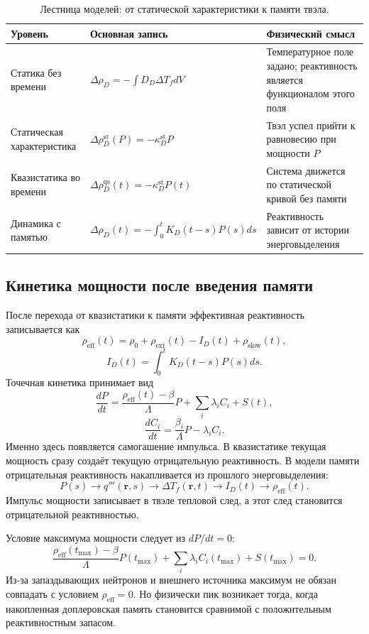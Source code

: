 \documentclass[12pt]{article}
\begin{document}
\begin{table}[H]
\centering
\caption{Лестница моделей: от статической характеристики к памяти твэла.}
\label{tab:static_to_memory_ladder}
\begin{tabular}{|>{\centering\arraybackslash}p{3.0cm}|p{5.2cm}|p{5.4cm}|}
\hline
Уровень & Основная запись & Физический смысл\\
\hline
Статика без времени & \(\Delta\rho_D=-\int D_D\Delta T_f dV\) & Температурное поле задано; реактивность является функционалом этого поля\\
\hline
Статическая характеристика & \(\Delta\rho_D^{\mathrm{st}}(P)=-\kappa_D^{\mathrm{st}}P\) & Твэл успел прийти к равновесию при мощности \(P\)\\
\hline
Квазистатика во времени & \(\Delta\rho_D^{\mathrm{qs}}(t)=-\kappa_D^{\mathrm{st}}P(t)\) & Система движется по статической кривой без памяти\\
\hline
Динамика с памятью & \(\Delta\rho_D(t)=-\int_0^tK_D(t-s)P(s)ds\) & Реактивность зависит от истории энерговыделения\\
\hline
\end{tabular}
\end{table}

\subsection{Кинетика мощности после введения памяти}

После перехода от квазистатики к памяти эффективная реактивность записывается как
\[
\rho_{\mathrm{eff}}(t)
=
\rho_0+
\rho_{\mathrm{ext}}(t)-I_D(t)+\rho_{\mathrm{slow}}(t),
\]
\[
I_D(t)=\int_0^tK_D(t-s)P(s)ds.
\]
Точечная кинетика принимает вид
\[
\frac{dP}{dt}
=
\frac{\rho_{\mathrm{eff}}(t)-\beta}{\Lambda}P
+
\sum_i\lambda_iC_i+S(t),
\]
\[
\frac{dC_i}{dt}
=
\frac{\beta_i}{\Lambda}P-
\lambda_iC_i.
\]
Именно здесь появляется самогашение импульса. В квазистатике текущая мощность сразу создаёт текущую отрицательную реактивность. В модели памяти отрицательная реактивность накапливается из прошлого энерговыделения:
\[
P(s)
\rightarrow
q'''(\mathbf r,s)
\rightarrow
\Delta T_f(\mathbf r,t)
\rightarrow
I_D(t)
\rightarrow
\rho_{\mathrm{eff}}(t).
\]
Импульс мощности записывает в твэле тепловой след, а этот след становится отрицательной реактивностью.

Условие максимума мощности следует из \(dP/dt=0\):
\[
\frac{\rho_{\mathrm{eff}}(t_{\max})-\beta}{\Lambda}P(t_{\max})
+
\sum_i\lambda_iC_i(t_{\max})+S(t_{\max})=0.
\]
Из-за запаздывающих нейтронов и внешнего источника максимум не обязан совпадать с условием \(\rho_{\mathrm{eff}}=0\). Но физически пик возникает тогда, когда накопленная доплеровская память становится сравнимой с положительным реактивностным запасом.
\end{document}
